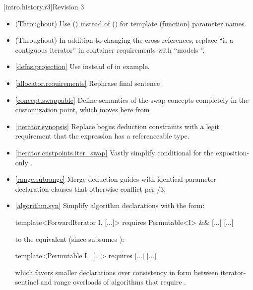 [intro.history.r3]{Revision 3}
\begin{itemize}
\item (Throughout) Use  () instead of  () for
   template (function) parameter names.
\item (Throughout) In addition to changing the cross references, replace
  ``is a contiguous iterator'' in container requirements with ``models
  ''.
\item \ref{defns.projection} Use  instead of 
  in example.
\item \ref{allocator.requirements} Rephrase final sentence
\item \ref{concept.swappable} Define semantics of the swap concepts completely in
  the  customization point, which moves here from 
\item \ref{iterator.synopsis} Replace bogus 
  deduction constraints with a legit requirement that the expression has
  a referenceable type.
\item \ref{iterator.custpoints.iter_swap} Vastly simplify conditional
   for the exposition-only .
\item \ref{range.subrange} Merge  deduction guides with identical
  parameter-declaration-clauses that otherwise conflict per
  /3.
\item \ref{algorithm.syn} Simplify algorithm declarations with the form:
\begin{codeblock}
template<ForwardIterator I, [...]>
  requires Permutable<I> && [...]
[...]
\end{codeblock}
to the equivalent (since  subsumes ):
\begin{codeblock}
template<Permutable I, [...]>
  requires [...]
[...]
\end{codeblock}
which favors smaller declarations over consistency in form between
iterator-sentinel and range overloads of algorithms that require
.
\end{itemize}

